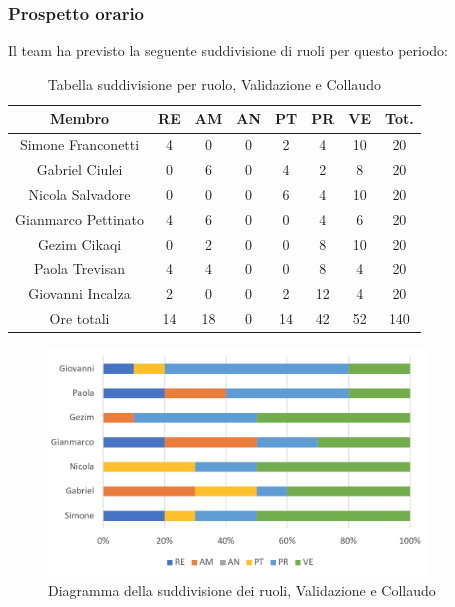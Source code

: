 \subsubsection{Prospetto orario}
Il team ha previsto la seguente suddivisione di ruoli per questo periodo:
\begin{table}[h]
\caption{Tabella suddivisione per ruolo, Validazione e Collaudo}  
\begin{center}
\begin{tabular}{ |c|c|c|c|c|c|c|c|  }
 \hline
 Membro 		& RE 	& AM 	& AN 	& PT 	& PR 	& VE 	& Tot.\\
 \hline\hline
 Simone Franconetti			& 4 		& 0		& 0 	& 2 		& 4 		& 10 		& 20\\
 Gabriel Ciulei		& 0 		& 6 		& 0 	& 4		& 2 		& 8 		& 20\\
 Nicola	Salvadore		& 0 		& 0 		& 0 	& 6 		& 4 		& 10 		& 20\\
 Gianmarco Pettinato		& 4 		& 6 		& 0 	& 0	 	& 4 		& 6 		& 20\\
 Gezim Cikaqi			& 0 		& 2 		& 0 	& 0 		& 8 		& 10	 	& 20\\
 Paola Trevisan			& 4 		& 4 		& 0 	& 0 		& 8 		& 4 		& 20\\
 Giovanni Incalza		& 2 		& 0	 	& 0 	& 2 		& 12 	& 4  	& 20\\
 \hline\hline
 Ore totali		& 14		& 18		& 0 	& 14	 	& 42 	& 52 	& 140\\
  \hline
\end{tabular}
\end{center}
\end{table}
\begin{figure}[h!]
	\centering
	\includegraphics[width=0.9\textwidth]{res/img/hi5}
	\caption{Diagramma della suddivisione dei ruoli, Validazione e Collaudo}
\end{figure}

